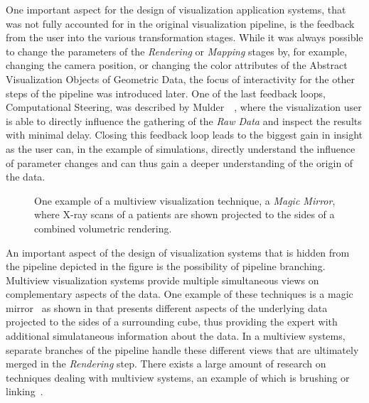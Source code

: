 One important aspect for the design of visualization application systems, that was not fully accounted for in the original visualization pipeline, is the feedback from the user into the various transformation stages.  While it was always possible to change the parameters of the \emph{Rendering} or \emph{Mapping} stages by, for example, changing the camera position, or changing the color attributes of the Abstract Visualization Objects of Geometric Data, the focus of interactivity for the other steps of the pipeline was introduced later.  One of the last feedback loops, Computational Steering, was described by Mulder~\etal~\cite{mulder1999survey}, where the visualization user is able to directly influence the gathering of the \emph{Raw Data} and inspect the results with minimal delay.  Closing this feedback loop leads to the biggest gain in insight as the user can, in the example of simulations, directly understand the influence of parameter changes and can thus gain a deeper understanding of the origin of the data.

\begin{figure}
  \centering
  \caption{One example of a multiview visualization technique, a \emph{Magic Mirror}, where X-ray scans of a patients are shown projected to the sides of a combined volumetric rendering.}
  \label{fig:intro:mm}
\end{figure}

An important aspect of the design of visualization systems that is hidden from the pipeline depicted in the figure is the possibility of pipeline branching.  Multiview visualization systems provide multiple simultaneous views on complementary aspects of the data.  One example of these techniques is a magic mirror~\cite{konig1999multiple} as shown in  that presents different aspects of the underlying data projected to the sides of a surrounding cube, thus providing the expert with additional simulataneous information about the data.  In a multiview systems, separate branches of the pipeline handle these different views that are ultimately merged in the \emph{Rendering} step.  There exists a large amount of research on techniques dealing with multiview systems, an example of which is brushing or linking~\cite{tory2003mental}.

